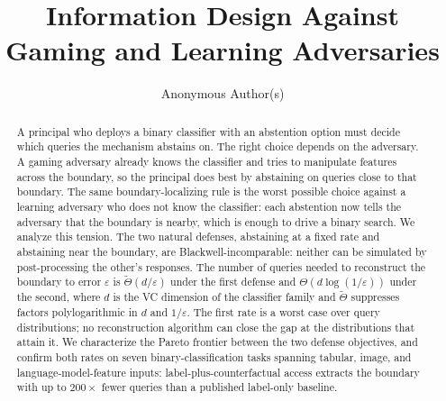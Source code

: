 \documentclass[runningheads,envcountsame]{llncs}
\newcommand{\eps}{\varepsilon}
\begin{document}
\title{Information Design Against Gaming and Learning Adversaries}

\author{Anonymous Author(s)}

\maketitle

\begin{abstract}
A principal who deploys a binary classifier with an abstention option must decide which queries the mechanism abstains on. The right choice depends on the adversary. A gaming adversary already knows the classifier and tries to manipulate features across the boundary, so the principal does best by abstaining on queries close to that boundary. The same boundary-localizing rule is the worst possible choice against a learning adversary who does not know the classifier: each abstention now tells the adversary that the boundary is nearby, which is enough to drive a binary search. We analyze this tension. The two natural defenses, abstaining at a fixed rate and abstaining near the boundary, are Blackwell-incomparable: neither can be simulated by post-processing the other's responses. The number of queries needed to reconstruct the boundary to error $\eps$ is $\tilde\Theta(d/\eps)$ under the first defense and $\Theta(d \log(1/\eps))$ under the second, where $d$ is the VC dimension of the classifier family and $\tilde\Theta$ suppresses factors polylogarithmic in $d$ and $1/\eps$. The first rate is a worst case over query distributions; no reconstruction algorithm can close the gap at the distributions that attain it. We characterize the Pareto frontier between the two defense objectives, and confirm both rates on seven binary-classification tasks spanning tabular, image, and language-model-feature inputs: label-plus-counterfactual access extracts the boundary with up to $200\times$ fewer queries than a published label-only baseline.

\end{abstract}

\end{document}
